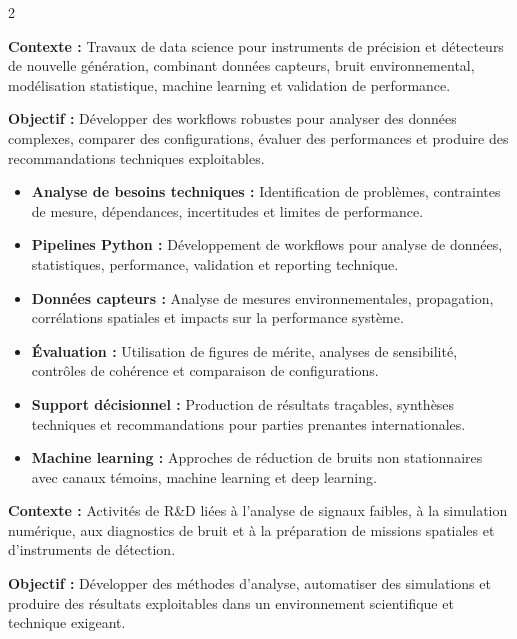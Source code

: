 \documentclass[8pt,a4paper,ragged2e,withhyper]{altacv}
\begin{document}
\begin{paracol}{2}

\textbf{Contexte :} Travaux de data science pour instruments de précision et détecteurs de nouvelle génération, combinant données capteurs, bruit environnemental, modélisation statistique, machine learning et validation de performance.

\textbf{Objectif :} Développer des workflows robustes pour analyser des données complexes, comparer des configurations, évaluer des performances et produire des recommandations techniques exploitables.

\begin{itemize}
  \item \textbf{Analyse de besoins techniques :} Identification de problèmes, contraintes de mesure, dépendances, incertitudes et limites de performance.
  \item \textbf{Pipelines Python :} Développement de workflows pour analyse de données, statistiques, performance, validation et reporting technique.
  \item \textbf{Données capteurs :} Analyse de mesures environnementales, propagation, corrélations spatiales et impacts sur la performance système.
  \item \textbf{Évaluation :} Utilisation de figures de mérite, analyses de sensibilité, contrôles de cohérence et comparaison de configurations.
  \item \textbf{Support décisionnel :} Production de résultats traçables, synthèses techniques et recommandations pour parties prenantes internationales.
  \item \textbf{Machine learning :} Approches de réduction de bruits non stationnaires avec canaux témoins, machine learning et deep learning.
\end{itemize}

\divider


\textbf{Contexte :} Activités de R\&D liées à l’analyse de signaux faibles, à la simulation numérique, aux diagnostics de bruit et à la préparation de missions spatiales et d’instruments de détection.

\textbf{Objectif :} Développer des méthodes d’analyse, automatiser des simulations et produire des résultats exploitables dans un environnement scientifique et technique exigeant.


\end{paracol}
\end{document}
